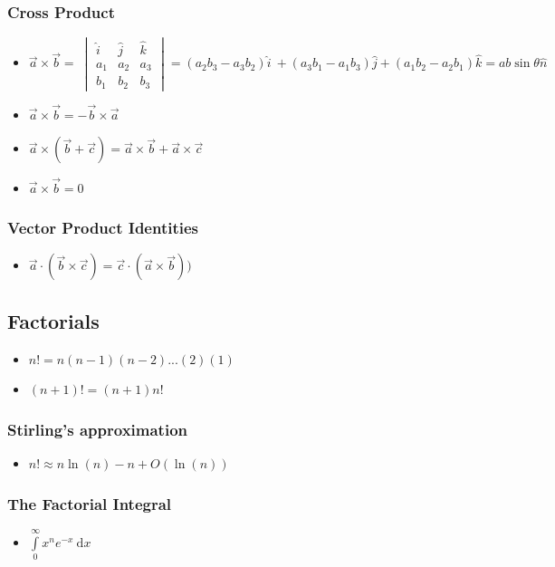 \documentclass[]{report}
\newcommand \tab[1][1cm]{\hspace*{#1}}
\newcommand{\dn}[1]{\ \mathrm{d}#1}
\newcommand{\itemt}{\item \tab}
\begin{document}
\def\arraystretch{1}
\subsubsection{Cross Product}
\begin{itemize}
\itemt \( \vec{a} \times \vec{b} =\ 
\begin{vmatrix}
\hat{i} & \hat{j} 	& \hat{k} 	\\
a_1		& a_2		& a_3		\\
b_1		& b_2		& b_3		
\end{vmatrix}  = (a_2b_3 - a_3b_2)\hat{i}\ + (a_3b_1 - a_1b_3)\hat{j} + (a_1b_2 - a_2b_1)\hat{k} = ab\sin\theta\hat{n} \)
\itemt \( \vec{a} \times \vec{b} = - \vec{b} \times \vec{a} \)
\itemt \( \vec{a} \times (\vec{b} + \vec{c}) = \vec{a} \times \vec{b} + \vec{a} \times \vec{c} \)
\itemt \( \vec{a} \times \vec{b} = 0 \)
\end{itemize}

\subsubsection{Vector Product Identities}
\begin{itemize}
    \itemt \( \vec{a}\cdot(\vec{b}\times\vec{c}) = \vec{c}\cdot(\vec{a}\times\vec{b})) \)
\end{itemize}

\subsection{Factorials}
\begin{itemize}
\itemt \( n! = n(n-1)(n-2)...(2)(1) \)
\itemt \( (n+1)! = (n+1)n! \)
\end{itemize}

\subsubsection{Stirling's approximation}
\begin{itemize}
\itemt \( n! \approx n \ln (n) - n + O(\ln(n))\)
\end{itemize}

\subsubsection{The Factorial Integral}
\begin{itemize}
\itemt \( \int\limits_0^\infty x^ne^{-x} \dn x \)
\end{itemize}           
\end{document}
